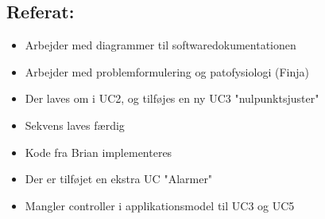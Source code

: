 \documentclass[a4paper,11pt,oneside]{memoir}
\newcommand{\R}{\ensuremath{\mathbb{R}}}
\begin{document}
\subsection{Referat:}
\begin{itemize}
\item Arbejder med diagrammer til softwaredokumentationen
\item Arbejder med problemformulering og patofysiologi (Finja) 
\item Der laves om i UC2, og tilføjes en ny UC3 "nulpunktsjuster"
\item Sekvens laves færdig
\item Kode fra Brian implementeres
\item Der er tilføjet en ekstra UC "Alarmer"
\item Mangler controller i applikationsmodel til UC3 og UC5
\end{itemize}

\newpage


\end{document}
